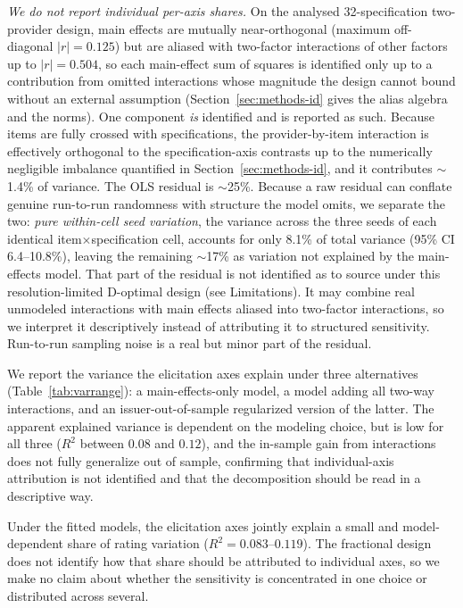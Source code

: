 \documentclass[a4paper,fleqn]{cas-sc}
\begin{document}
\emph{We do not report individual per-axis shares.} On the analysed 32-specification two-provider design, main effects are
mutually near-orthogonal (maximum off-diagonal $|r|=0.125$) but are aliased with two-factor
interactions of other factors up to $|r|=0.504$, so each main-effect sum of
squares is identified only up to a contribution from omitted interactions whose magnitude the design
cannot bound without an external assumption (Section~\ref{sec:methods-id} gives the alias algebra and the norms). One component \emph{is} identified and is reported as
such. Because items are fully crossed with specifications, the provider-by-item interaction is
effectively orthogonal to the specification-axis contrasts up to the numerically negligible imbalance quantified in Section~\ref{sec:methods-id}, and it contributes $\sim$1.4\% of variance. The OLS residual
is $\sim$25\%. Because a raw residual can conflate genuine run-to-run randomness with structure the model
omits, we separate the two: \emph{pure within-cell seed variation}, the variance across the three seeds
of each identical item$\times$specification cell, accounts for only 8.1\% of total variance (95\% CI
6.4--10.8\%), leaving the remaining $\sim$17\% as variation not explained by the main-effects model.
That part of the residual is not identified as to source under this resolution-limited D-optimal design
(see Limitations). It may combine real unmodeled interactions with main effects aliased into two-factor
interactions, so we interpret it descriptively instead of attributing it to structured sensitivity.
Run-to-run sampling noise is a real but minor part of the residual.

We report the variance the
elicitation axes explain under three alternatives (Table~\ref{tab:varrange}): a main-effects-only model,
a model adding all two-way interactions, and an issuer-out-of-sample regularized version of the latter.
The apparent explained variance is dependent on the modeling choice, but is low for all three
($R^2$ between $0.08$ and $0.12$), and the in-sample gain from interactions does not fully generalize out
of sample, confirming that individual-axis attribution is not identified and that the decomposition should
be read in a descriptive way.

Under the fitted models, the elicitation axes jointly explain a small and model-dependent share of
rating variation ($R^2=0.083$--$0.119$). The fractional design does not identify how that share
should be attributed to individual axes, so we make no claim about whether the sensitivity is
concentrated in one choice or distributed across several.
\end{document}
